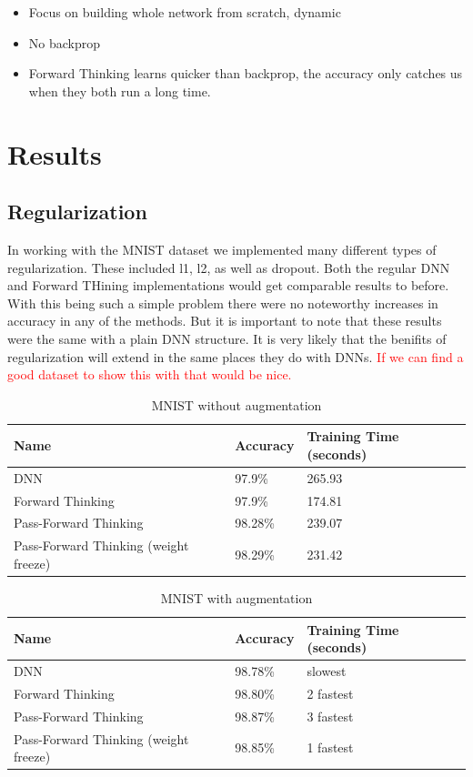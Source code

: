 \documentclass{article}
\newcommand\todo[1]{\textcolor{red}{#1}}
\begin{document}
\begin{itemize}
\item Focus on building whole network from scratch, dynamic
\item No backprop
\item Forward Thinking learns quicker than backprop, the accuracy only catches us when they both run a long time.

\end{itemize}


\section{Results}

\subsection{Regularization}

In working with the MNIST dataset we implemented many different types of regularization. These included l1, l2, as well as dropout. Both the regular DNN and Forward THining implementations would get comparable results to before. With this being such a simple problem there were no noteworthy increases in accuracy in any of the methods. But it is important to note that these results were the same with a plain DNN structure. It is very likely that the benifits of regularization will extend in the same places they do with DNNs. \todo{If we can find a good dataset to show this with that would be nice.}


\begin{table}[h]
  \caption{MNIST without augmentation}
  \label{mnist-table}
  \centering
  \begin{tabular}{lll}
    \toprule                
    Name     & Accuracy & Training Time (seconds) \\
    \midrule
    DNN &     97.9\%   & 265.93 \\
    Forward Thinking  & 97.9\% & 174.81  \\
    Pass-Forward Thinking  & 98.28\%  & 239.07 \\
    Pass-Forward Thinking  (weight freeze)& 98.29\% & 231.42 \\
    \bottomrule
  \end{tabular}
\end{table}

\begin{table}[h]
  \caption{MNIST with augmentation}
  \label{mnist-table}
  \centering
  \begin{tabular}{lll}
    \toprule                
    Name     & Accuracy & Training Time (seconds) \\
    \midrule
    DNN &     98.78\%   & slowest \\
    Forward Thinking  & 98.80\% &  2 fastest\\
    Pass-Forward Thinking  & 98.87\%  & 3 fastest\\
    Pass-Forward Thinking  (weight freeze) & 98.85\% & 1 fastest \\
    \bottomrule
  \end{tabular}
\end{table}
\end{document}
